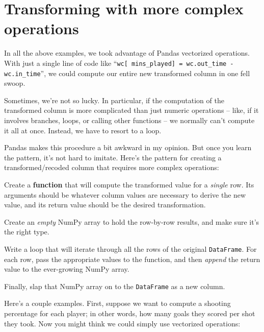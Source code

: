 \section{Transforming with more complex operations}


In all the above examples, we took advantage of Pandas vectorized operations.
With just a single line of code like ``\texttt{wc[\textquotesingle
mins\_played\textquotesingle] = wc.out\_time - wc.in\_time}'', we could compute
our entire new transformed column in one fell swoop.


Sometimes, we're not so lucky. In particular, if the computation of the
transformed column is more complicated than just numeric operations -- like, if
it involves branches, loops, or calling other functions -- we normally can't
compute it all at once. Instead, we have to resort to a loop.

Pandas makes this procedure a bit awkward in my opinion. But once you learn the
pattern, it's not hard to imitate. Here's the pattern for creating a
transformed/recoded column that requires more complex operations:

\begin{shaded}
\begin{compactenum}
\item Create a \textbf{function} that will compute the transformed value for a
\textit{single} row. Its arguments should be whatever column values are
necessary to derive the new value, and its return value should be the desired
transformation.
\item Create an \textit{empty} NumPy array to hold the row-by-row results, and
make sure it's the right type.
\item Write a loop that will iterate through all the rows of the original
\texttt{DataFrame}. For each row, pass the appropriate values to the function,
and then \textit{append} the return value to the ever-growing NumPy array.
\item Finally, slap that NumPy array on to the \texttt{DataFrame} as a new
column.
\end{compactenum}

\end{shaded}

Here's a couple examples. First, suppose we want to compute a shooting
percentage for each player; in other words, how many goals they scored per shot
they took. Now you might think we could simply use vectorized operations:


